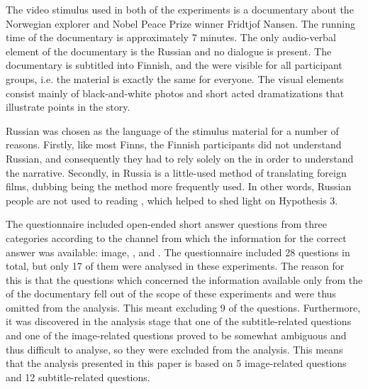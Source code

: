 \documentclass[output=paper]{langsci/langscibook}
\begin{document}
The video stimulus used in both of the experiments is a documentary about the Norwegian explorer and Nobel Peace Prize winner Fridtjof Nansen. The running time of the documentary is approximately 7 minutes. The only audio-verbal element of the documentary is the Russian  and no dialogue is present. The documentary is subtitled into Finnish, and the  were visible for all participant groups, i.e. the material is exactly the same for everyone. The visual elements consist mainly of black-and-white photos and short acted dramatizations that illustrate points in the story. 

Russian was chosen as the language of the stimulus material for a number of reasons. Firstly, like most Finns, the Finnish participants did not understand Russian, and consequently they had to rely solely on the  in order to understand the narrative. Secondly, in Russia  is a little-used method of translating foreign films, dubbing being the method more frequently used. In other words, Russian people are not used to reading , which helped to shed light on Hypothesis 3. 

The questionnaire included open-ended short answer questions from three categories according to the channel from which the information for the correct answer was available: image, , and . The questionnaire included 28 questions in total, but only 17 of them were analysed in these experiments. The reason for this is that the questions which concerned the information available only from the  of the documentary fell out of the scope of these experiments and were thus omitted from the analysis. This meant excluding 9 of the questions. Furthermore, it was discovered in the analysis stage that one of the subtitle-related questions and one of the image-related questions proved to be somewhat ambiguous and thus difficult to analyse, so they were excluded from the analysis. This means that the analysis presented in this paper is based on 5 image-related questions and 12 subtitle-related questions. 
\end{document}
